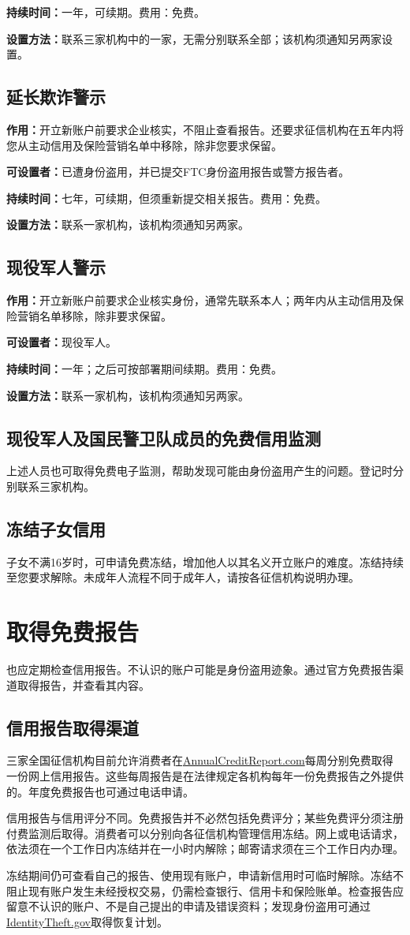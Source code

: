 \documentclass[UTF8,fontset=none,11pt,a4paper]{ctexart}
\begin{document}
\textbf{持续时间：}一年，可续期。费用：免费。


\textbf{设置方法：}联系三家机构中的一家，无需分别联系全部；该机构须通知另两家设置。


\subsection*{延长欺诈警示}
\textbf{作用：}开立新账户前要求企业核实，不阻止查看报告。还要求征信机构在五年内将您从主动信用及保险营销名单中移除，除非您要求保留。


\textbf{可设置者：}已遭身份盗用，并已提交FTC身份盗用报告或警方报告者。


\textbf{持续时间：}七年，可续期，但须重新提交相关报告。费用：免费。


\textbf{设置方法：}联系一家机构，该机构须通知另两家。


\subsection*{现役军人警示}
\textbf{作用：}开立新账户前要求企业核实身份，通常先联系本人；两年内从主动信用及保险营销名单移除，除非要求保留。


\textbf{可设置者：}现役军人。


\textbf{持续时间：}一年；之后可按部署期间续期。费用：免费。


\textbf{设置方法：}联系一家机构，该机构须通知另两家。


\subsection*{现役军人及国民警卫队成员的免费信用监测}
上述人员也可取得免费电子监测，帮助发现可能由身份盗用产生的问题。登记时分别联系三家机构。


\subsection*{冻结子女信用}
子女不满16岁时，可申请免费冻结，增加他人以其名义开立账户的难度。冻结持续至您要求解除。未成年人流程不同于成年人，请按各征信机构说明办理。


\section*{取得免费报告}
也应定期检查信用报告。不认识的账户可能是身份盗用迹象。通过官方免费报告渠道取得报告，并查看其内容。


\subsection*{信用报告取得渠道}
三家全国征信机构目前允许消费者在\url{AnnualCreditReport.com}每周分别免费取得一份网上信用报告。这些每周报告是在法律规定各机构每年一份免费报告之外提供的。年度免费报告也可通过电话申请。


信用报告与信用评分不同。免费报告并不必然包括免费评分；某些免费评分须注册付费监测后取得。消费者可以分别向各征信机构管理信用冻结。网上或电话请求，依法须在一个工作日内冻结并在一小时内解除；邮寄请求须在三个工作日内办理。


冻结期间仍可查看自己的报告、使用现有账户，申请新信用时可临时解除。冻结不阻止现有账户发生未经授权交易，仍需检查银行、信用卡和保险账单。检查报告应留意不认识的账户、不是自己提出的申请及错误资料；发现身份盗用可通过\url{IdentityTheft.gov}取得恢复计划。
\end{document}
